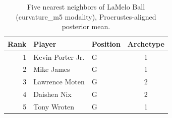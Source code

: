 \begin{table}[htbp]
  \centering\small
  \begin{tabular}{rllc}
    \toprule
    Rank & Player & Position & Archetype \\
    \midrule
    1 & Kevin Porter Jr. & G & 1 \\
    2 & Mike James & G & 1 \\
    3 & Lawrence Moten & G & 2 \\
    4 & Daishen Nix & G & 2 \\
    5 & Tony Wroten & G & 1 \\
    \bottomrule
  \end{tabular}
  \caption{Five nearest neighbors of LaMelo Ball (curvature_m5 modality), Procrustes-aligned posterior mean.}
  \label{tab:LaMelo_Ball_neighbors_curvature_m5}
\end{table}

